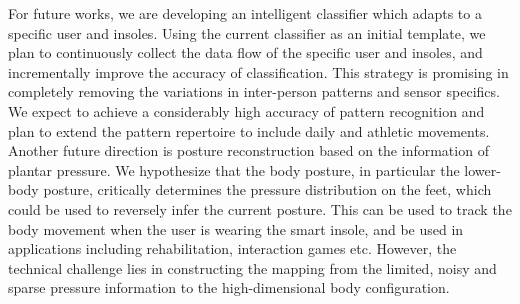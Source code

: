 \documentclass[review]{vgtc}                 %
\begin{document}
For future works, we are developing an intelligent classifier which adapts to a specific user and insoles.
Using the current classifier as an initial template, we plan to continuously collect the data flow of the specific user and insoles, and incrementally improve the accuracy of classification.
This strategy is promising in completely removing the variations in inter-person patterns and sensor specifics.
We expect to achieve a considerably high accuracy of pattern recognition and plan to extend the pattern repertoire to include daily and athletic movements.
Another future direction is posture reconstruction based on the information of plantar pressure. 
We hypothesize that the body posture, in particular the lower-body posture, critically determines the pressure distribution on the feet, which could be used to reversely infer the current posture. 
This can be used to track the body movement when the user is wearing the smart insole, and be used in applications including rehabilitation, interaction games etc.
However, the technical challenge lies in constructing the mapping from the limited, noisy and sparse pressure information to the high-dimensional body configuration. 







%

%
%
%


\end{document}
